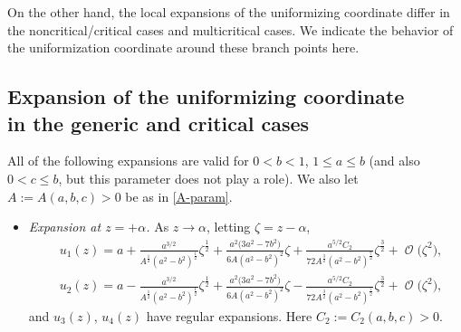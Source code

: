 \documentclass[pdftex]{sigma}
\DeclareMathOperator{\OO}{\mathcal{O}}
\numberwithin{equation}{section}
\begin{document}
On the other hand, the local expansions of the uniformizing coordinate differ in the noncritical/critical cases and multicritical cases. We indicate the behavior of the uniformization coordinate around these branch points here.

\subsection[Expansion of the uniformizing coordinate in the generic and critical cases]{Expansion of the uniformizing coordinate\\ in the generic and critical cases}
All of the following expansions are valid for $0 < b < 1$, $1\leq a\leq b$ (and also $0<c\leq b$, but this parameter does not play a role). We also let $A:=A(a,b,c) >0$ be as in \eqref{A-param}.
 \begin{itemize}\itemsep=0pt
 \item \textit{Expansion at $z= + \alpha$.}
 As $z\to \alpha$, letting $\zeta = z-\alpha$,
 \begin{align*}
 &u_1(z)= a +\frac{a^{3/2}}{A^{\frac{1}{2}}(a^2-b^2)^{\frac{1}{2}}}\zeta^{\frac{1}{2}} + \frac{a^2\bigl(3a^2-7b^2\bigr)}{6A(a^2-b^2)^2} \zeta + \frac{a^{5/2}C_2}{72A^{\frac{3}{2}}(a^2-b^2)^{\frac{7}{2}}}\zeta^{\frac{3}{2}} + \OO\bigl(\zeta^2\bigr),\\
 &u_2(z)= a-\frac{a^{3/2}}{A^{\frac{1}{2}}(a^2-b^2)^{\frac{1}{2}}}\zeta^{\frac{1}{2}} + \frac{a^2\bigl(3a^2-7b^2\bigr)}{6A(a^2-b^2)^2} \zeta - \frac{a^{5/2}C_2}{72A^{\frac{3}{2}}(a^2-b^2)^{\frac{7}{2}}}\zeta^{\frac{3}{2}} + \OO\bigl(\zeta^2\bigr),
 \end{align*}
 and $u_3(z)$, $u_4(z)$ have regular expansions. Here
$C_2:=C_2(a,b,c)>0$.


\end{itemize}
\end{document}
